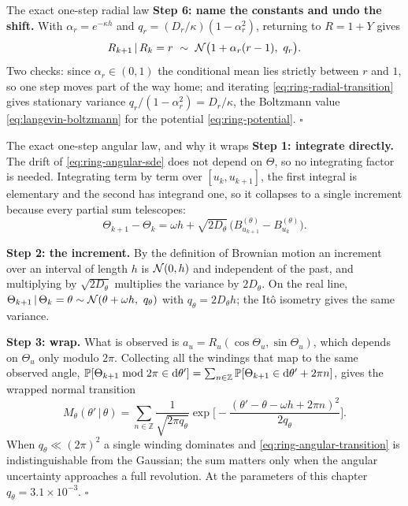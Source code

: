 \begin{toolbox}{The exact one-step radial law}
\textbf{Step 6: name the constants and undo the shift.} With
$\alpha_r = e^{-\kappa h}$ and
$q_r = (D_r/\kappa)(1-\alpha_r^2)$, returning to $R = 1 + Y$ gives
\begin{equation}
  R_{k+1} \,|\, R_k = r \ \sim\ \Nd\big(1 + \alpha_r (r-1),\ q_r\big) .
  \label{eq:ring-radial-transition}
\end{equation}
Two checks: since $\alpha_r \in (0,1)$ the conditional mean lies strictly
between $r$ and $1$, so one step moves part of the way home; and iterating
\eqref{eq:ring-radial-transition} gives stationary variance
$q_r/(1-\alpha_r^2) = D_r/\kappa$, the Boltzmann value \eqref{eq:langevin-boltzmann}
for the potential \eqref{eq:ring-potential}. \hfill$\square$
\end{toolbox}

\begin{toolbox}{The exact one-step angular law, and why it wraps}
\textbf{Step 1: integrate directly.} The drift of
\eqref{eq:ring-angular-sde} does not depend on $\Theta$, so no integrating
factor is needed. Integrating term by term over $[u_k, u_{k+1}]$, the first
integral is elementary and the second has integrand one, so it collapses to a
single increment because every partial sum telescopes:
\begin{equation*}
  \Theta_{k+1} - \Theta_k
  = \omega h
    + \sqrt{2D_\theta}\,\big(B^{(\theta)}_{u_{k+1}} - B^{(\theta)}_{u_k}\big) .
\end{equation*}

\textbf{Step 2: the increment.} By the definition of Brownian motion an
increment over an interval of length $h$ is $\mathcal{N}(0,h)$ and independent of the
past, and multiplying by $\sqrt{2D_\theta}$ multiplies the variance by
$2D_\theta$. On the real line,
$\Theta_{k+1}\,|\,\Theta_k = \theta \sim \mathcal{N}(\theta + \omega h,\ q_\theta)$
with $q_\theta = 2D_\theta h$; the It\^o isometry gives the same variance.

\textbf{Step 3: wrap.} What is observed is
$a_u = R_u(\cos\Theta_u, \sin\Theta_u)$, which depends on $\Theta_u$ only
modulo $2\pi$. Collecting all the windings that map to the same observed angle,
$\mathbb{P}[\Theta_{k+1} \bmod 2\pi \in \mathrm{d}\theta']
= \sum_{n \in \mathbb Z} \mathbb{P}[\Theta_{k+1} \in \mathrm{d}\theta' + 2\pi n]$, gives the
wrapped normal transition
\begin{equation}
  M_\theta(\theta' \,|\, \theta)
  = \sum_{n \in \mathbb Z} \frac{1}{\sqrt{2\pi q_\theta}}
    \exp\!\Big[ -\frac{(\theta' - \theta - \omega h + 2\pi n)^2}{2 q_\theta}
    \Big] .
  \label{eq:ring-angular-transition}
\end{equation}
When $q_\theta \ll (2\pi)^2$ a single winding dominates and
\eqref{eq:ring-angular-transition} is indistinguishable from the Gaussian; the
sum matters only when the angular uncertainty approaches a full revolution. At
the parameters of this chapter $q_\theta = 3.1\times10^{-3}$.
\hfill$\square$
\end{toolbox}

